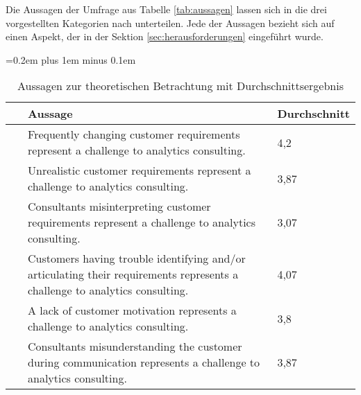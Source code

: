\documentclass[../main.tex]{subfiles}
\begin{document}
Die Aussagen der Umfrage aus Tabelle \ref{tab:aussagen} lassen sich in die drei vorgestellten Kategorien nach \citeauthor{luhmann1992communication} unterteilen.
Jede der Aussagen bezieht sich auf einen Aspekt, der in der Sektion \ref{sec:herausforderungen} eingeführt wurde.

\begin{dontcount}
    \small
    \spaceskip=0.2em plus 1em minus 0.1em
    \renewcommand{\arraystretch}{0.85}
    \begin{xltabular}[h]{\linewidth}{| N X | m{2.2cm}|}
        \caption{Aussagen zur theoretischen Betrachtung mit Durchschnittsergebnis \label{tab:aussagen}} \\
        \hline
         & Aussage & Durchschnitt \\
        \hline
        \hline
        \label{q:1} &\hspace{-0.8em}Frequently changing customer requirements represent a challenge to analytics consulting.& 4,2\\
        \hline  
        \label{q:2}&\hspace{-0.8em}Unrealistic customer requirements represent a challenge to analytics consulting. & 3,87 \\
        \hline
        \label{q:3}&\hspace{-0.8em}Consultants misinterpreting customer requirements represent a challenge to analytics consulting. & 3,07  \\
        \hline
        \label{q:4}&\hspace{-0.8em}Customers having trouble identifying and/or articulating their requirements represents a challenge to analytics consulting.  & 4,07  \\
        \hline
        \label{q:5}&\hspace{-0.8em}A lack of customer motivation represents a challenge to analytics consulting. & 3,8  \\
        \hline
        \label{q:6}&\hspace{-0.8em}Consultants misunderstanding the customer during communication represents a challenge to analytics consulting. & 3,87  \\

\end{xltabular}
\end{dontcount}
\end{document}
